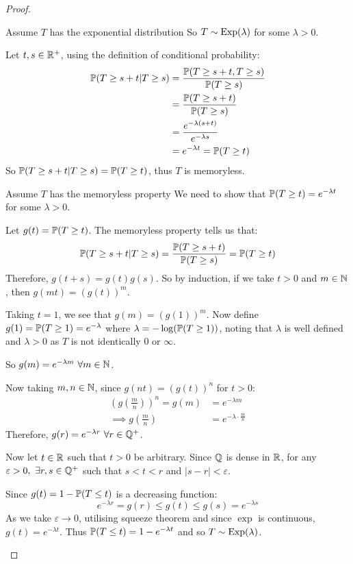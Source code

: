 \documentclass[../main.tex]{subfiles}
\begin{document}
\begin{proof}
  \begin{proofdirection}{Assume $T$ has the exponential distribution}
    So $T \sim \Exponential(\lambda)$ for some $\lambda > 0$.

    Let $t, s \in \R^{+}$, using the definition of conditional probability:
    \begin{align*}
      \P(T \geq s + t \vert T \geq s) &= \frac{\P(T \geq s + t, T \geq s)}{\P(T \geq s)} \\
                                      &= \frac{\P(T \geq s + t)}{\P(T \geq s)} \\
                                      &= \frac{e^{-\lambda(s + t)}}{e^{-\lambda s}} \\
                                      &= e^{-\lambda t} = \P(T \geq t)
    \end{align*}
    So $\P(T \geq s + t \vert T \geq s) = \P(T \geq t)$, thus $T$ is memoryless.
  \end{proofdirection}
  \begin{proofdirection}{Assume $T$ has the memoryless property}
    We need to show that $\P(T \geq t) = e^{-\lambda t}$ for some $\lambda > 0$.

    Let $g(t) = \P(T \geq t)$.
    The memoryless property tells us that:
    \[
      \P(T\geq s + t \vert T \geq s) = \frac{\P(T \geq s + t)}{\P(T \geq s)} = \P(T \geq t)
    \]
    Therefore, $g(t + s) = g(t)g(s)$.
    So by induction, if we take $t > 0$ and $m \in \N$, then $g(mt) = (g(t))^{m}$.

    Taking $t = 1$, we see that $g(m) = (g(1))^{m}$.
    Now define $g(1) = \P(T \geq 1) = e^{-\lambda}$ where $\lambda = - \log(\P(T \geq 1))$, noting that $\lambda$ is well defined and $\lambda > 0$ as $T$ is not identically 0 or $\infty$.

    So $g(m) = e^{-\lambda m}\ \forall m \in \N$.

    Now taking $m, n \in \N$, since $g(nt) = (g(t))^{n}$ for $t > 0$:
    \begin{align*}
      \left(g\left(\frac{m}{n}\right)\right)^{n} = g(m) &= e^{-\lambda m} \\
      \implies g\left(\frac{m}{n}\right) &= e^{-\lambda \cdot \frac{m}{n}}
    \end{align*}
    Therefore, $g(r) = e^{-\lambda r}\ \forall r \in \Q^{+}$.

    Now let $t \in \R$ such that $t > 0$ be arbitrary.
    Since $\Q$ is dense in $\R$, for any $\varepsilon > 0,\ \exists r, s \in \Q^{+}$ such that $s < t < r$ and $|s - r| < \varepsilon$.

    Since $g(t) = 1 - \P(T \leq t)$ is a decreasing function:
    \[
      e^{-\lambda r} = g(r) \leq g(t) \leq g(s) = e^{-\lambda s}
    \]
    As we take $\varepsilon \to 0$, utilising squeeze theorem and since $\exp$ is continuous, $g(t) = e^{-\lambda t}$.
    Thus $\P(T \leq t) = 1 - e^{-\lambda t}$ and so $T \sim \Exponential(\lambda)$.
  \end{proofdirection}
\end{proof}
\end{document}
